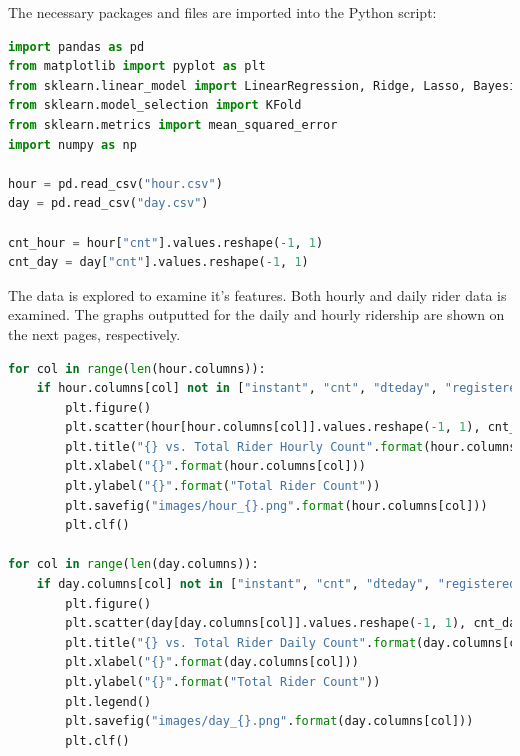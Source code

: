 \documentclass{homework}
\begin{document}
\begin{solution}
\begin{solution}

The necessary packages and files are imported into the Python script: 

\begin{lstlisting}[language=Python, firstnumber=1]
import pandas as pd
from matplotlib import pyplot as plt
from sklearn.linear_model import LinearRegression, Ridge, Lasso, BayesianRidge
from sklearn.model_selection import KFold
from sklearn.metrics import mean_squared_error
import numpy as np

hour = pd.read_csv("hour.csv")
day = pd.read_csv("day.csv")

cnt_hour = hour["cnt"].values.reshape(-1, 1)
cnt_day = day["cnt"].values.reshape(-1, 1)
\end{lstlisting}

The data is explored to examine it's features. Both hourly and daily rider data is examined. The graphs outputted for the daily and hourly ridership are shown on the next pages, respectively. 

\begin{lstlisting}[language=Python, firstnumber=15]
for col in range(len(hour.columns)):
    if hour.columns[col] not in ["instant", "cnt", "dteday", "registered", "casual"]:
        plt.figure()
        plt.scatter(hour[hour.columns[col]].values.reshape(-1, 1), cnt_hour)
        plt.title("{} vs. Total Rider Hourly Count".format(hour.columns[col]))
        plt.xlabel("{}".format(hour.columns[col]))
        plt.ylabel("{}".format("Total Rider Count"))
        plt.savefig("images/hour_{}.png".format(hour.columns[col]))
        plt.clf()

for col in range(len(day.columns)):
    if day.columns[col] not in ["instant", "cnt", "dteday", "registered", "casual"]:
        plt.figure()
        plt.scatter(day[day.columns[col]].values.reshape(-1, 1), cnt_day)
        plt.title("{} vs. Total Rider Daily Count".format(day.columns[col]))
        plt.xlabel("{}".format(day.columns[col]))
        plt.ylabel("{}".format("Total Rider Count"))
        plt.legend()
        plt.savefig("images/day_{}.png".format(day.columns[col]))
        plt.clf()
\end{lstlisting}


\end{solution}
\end{solution}
\end{document}

